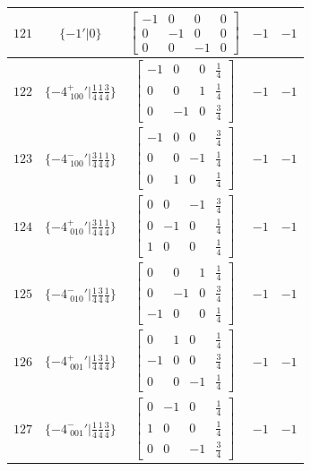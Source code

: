 \documentclass[fleqn,8pt]{jsarticle}
\begin{document}
\begin{longtable}{ccccc}
$ 121 $ & $ \{-1{}'|0\} $ & $ \begin{bmatrix} -1 & 0 & 0 & 0 \\ 0 & -1 & 0 & 0 \\ 0 & 0 & -1 & 0 \end{bmatrix} $ & $ -1 $ & $ -1 $ \\ \hline
$ 122 $ & $ \{-4^{+}_{\,\,100}{}'|\frac{1}{4} \frac{1}{4} \frac{3}{4}\} $ & $ \begin{bmatrix} -1 & 0 & 0 & \frac{1}{4} \\ 0 & 0 & 1 & \frac{1}{4} \\ 0 & -1 & 0 & \frac{3}{4} \end{bmatrix} $ & $ -1 $ & $ -1 $ \\ \hline
$ 123 $ & $ \{-4^{-}_{\,\,100}{}'|\frac{3}{4} \frac{1}{4} \frac{1}{4}\} $ & $ \begin{bmatrix} -1 & 0 & 0 & \frac{3}{4} \\ 0 & 0 & -1 & \frac{1}{4} \\ 0 & 1 & 0 & \frac{1}{4} \end{bmatrix} $ & $ -1 $ & $ -1 $ \\ \hline
$ 124 $ & $ \{-4^{+}_{\,\,010}{}'|\frac{3}{4} \frac{1}{4} \frac{1}{4}\} $ & $ \begin{bmatrix} 0 & 0 & -1 & \frac{3}{4} \\ 0 & -1 & 0 & \frac{1}{4} \\ 1 & 0 & 0 & \frac{1}{4} \end{bmatrix} $ & $ -1 $ & $ -1 $ \\ \hline
$ 125 $ & $ \{-4^{-}_{\,\,010}{}'|\frac{1}{4} \frac{3}{4} \frac{1}{4}\} $ & $ \begin{bmatrix} 0 & 0 & 1 & \frac{1}{4} \\ 0 & -1 & 0 & \frac{3}{4} \\ -1 & 0 & 0 & \frac{1}{4} \end{bmatrix} $ & $ -1 $ & $ -1 $ \\ \hline
$ 126 $ & $ \{-4^{+}_{\,\,001}{}'|\frac{1}{4} \frac{3}{4} \frac{1}{4}\} $ & $ \begin{bmatrix} 0 & 1 & 0 & \frac{1}{4} \\ -1 & 0 & 0 & \frac{3}{4} \\ 0 & 0 & -1 & \frac{1}{4} \end{bmatrix} $ & $ -1 $ & $ -1 $ \\ \hline
$ 127 $ & $ \{-4^{-}_{\,\,001}{}'|\frac{1}{4} \frac{1}{4} \frac{3}{4}\} $ & $ \begin{bmatrix} 0 & -1 & 0 & \frac{1}{4} \\ 1 & 0 & 0 & \frac{1}{4} \\ 0 & 0 & -1 & \frac{3}{4} \end{bmatrix} $ & $ -1 $ & $ -1 $ \\ \hline

\end{longtable}
\end{document}
